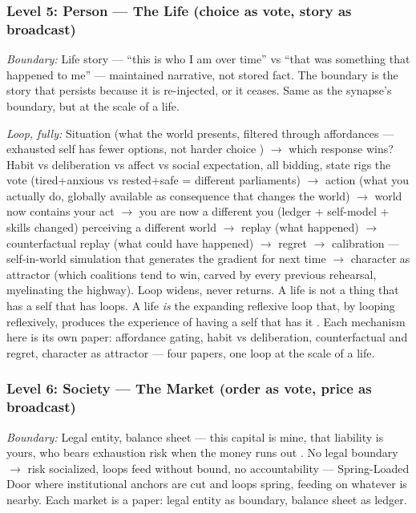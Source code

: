 \documentclass[11pt]{article}
\begin{document}
\subsubsection{Level 5: Person --- The Life (choice as vote, story as broadcast)}

\textit{Boundary:} Life story --- ``this is who I am over time'' vs ``that was something that happened to me'' --- maintained narrative, not stored fact. The boundary is the story that persists because it is re-injected, or it ceases. Same as the synapse's boundary, but at the scale of a life.

\textit{Loop, fully:} Situation (what the world presents, filtered through affordances --- exhausted self has fewer options, not harder choice \citep{seth2021}) $\to$ which response wins? Habit vs deliberation vs affect vs social expectation, all bidding, state rigs the vote (tired+anxious vs rested+safe = different parliaments) $\to$ action (what you actually do, globally available as consequence that changes the world) $\to$ world now contains your act $\to$ you are now a different you (ledger + self-model + skills changed) perceiving a different world $\to$ replay (what happened) $\to$ counterfactual replay (what could have happened) $\to$ regret $\to$ calibration --- self-in-world simulation that generates the gradient for next time \citep{tononi2014,sofroniew2026} $\to$ character as attractor (which coalitions tend to win, carved by every previous rehearsal, myelinating the highway). Loop widens, never returns. A life is not a thing that has a self that has loops. A life \emph{is} the expanding reflexive loop that, by looping reflexively, produces the experience of having a self that has it \citep{maturana1980}. Each mechanism here is its own paper: affordance gating, habit vs deliberation, counterfactual and regret, character as attractor --- four papers, one loop at the scale of a life.

\subsubsection{Level 6: Society --- The Market (order as vote, price as broadcast)}

\textit{Boundary:} Legal entity, balance sheet --- this capital is mine, that liability is yours, who bears exhaustion risk when the money runs out \citep{white1986}. No legal boundary $\to$ risk socialized, loops feed without bound, no accountability --- Spring-Loaded Door where institutional anchors are cut and loops spring, feeding on whatever is nearby. Each market is a paper: legal entity as boundary, balance sheet as ledger.
\end{document}
